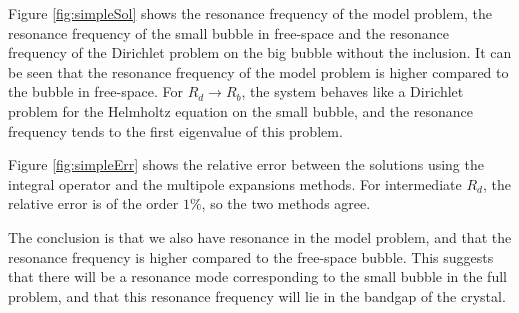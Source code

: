 \documentclass[a4paper]{article}
\theoremstyle{definition}
\begin{document}
Figure \ref{fig:simpleSol} shows the resonance frequency of the model problem, the resonance frequency of the small bubble in free-space and the resonance frequency of the Dirichlet problem on the big bubble without the inclusion. It can be seen that the resonance frequency of the model problem is higher compared to the bubble in free-space. For $R_d \rightarrow R_b$, the system behaves like a Dirichlet problem for the Helmholtz equation on the small bubble, and the resonance frequency tends to the first eigenvalue of this problem.

Figure \ref{fig:simpleErr} shows the relative error between the solutions using the integral operator and the multipole expansions methods. For intermediate $R_d$, the relative error is of the order $1\%$, so the two methods agree.

The conclusion is that we also have resonance in the model problem, and that the resonance frequency is higher compared to the free-space bubble. This suggests that there will be a resonance mode corresponding to the small bubble in the full problem, and that this resonance frequency will lie in the bandgap of the crystal.
\end{document}
